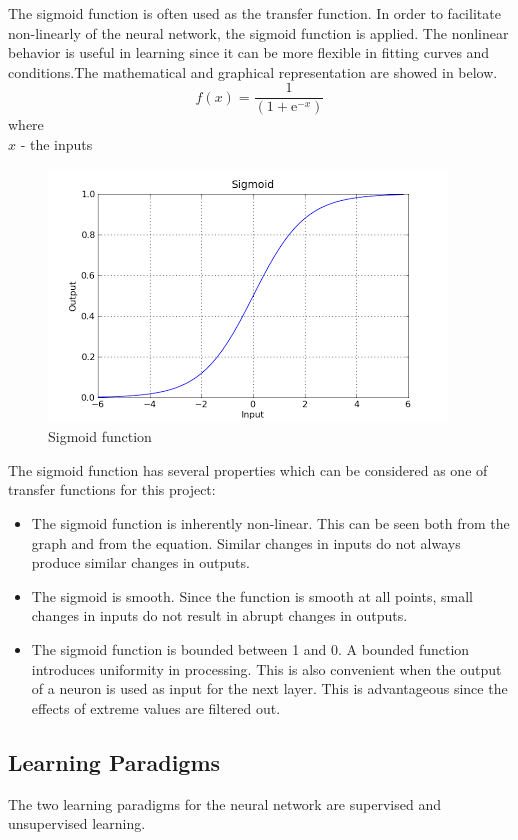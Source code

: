 The sigmoid function is often used as the transfer function. In order to facilitate non-linearly of the neural network, the sigmoid function is applied. The nonlinear behavior is useful in learning since it can be more flexible in fitting curves and conditions.The mathematical and graphical representation are showed in below.
\begin{equation*}
	f(x)= \frac {1}{(1 + \mathrm{e}^{-x})}
\end{equation*}
where \\
$x$ - the inputs
\begin{figure}[hbt!]\centering
	\includegraphics[width=.6\textwidth]{sigmoid}
	\caption{Sigmoid function}
\end{figure}

The sigmoid function has several properties which can be considered as one of transfer functions for this project:
\begin{itemize}
	\item The sigmoid function is inherently non-linear. This can be seen both from the graph and from the equation. Similar changes in inputs do not always produce similar changes in outputs.
	\item The sigmoid is smooth. Since the function is smooth at all points, small
	changes in inputs do not result in abrupt changes in outputs.
	\item The sigmoid function is bounded between 1 and 0. A bounded function
	introduces uniformity in processing. This is also convenient when the
	output of a neuron is used as input for the next layer. This is advantageous since the effects of extreme values are filtered out.
\end{itemize}
\subsection{Learning Paradigms}

The two learning paradigms for the neural network  are supervised and unsupervised learning.


